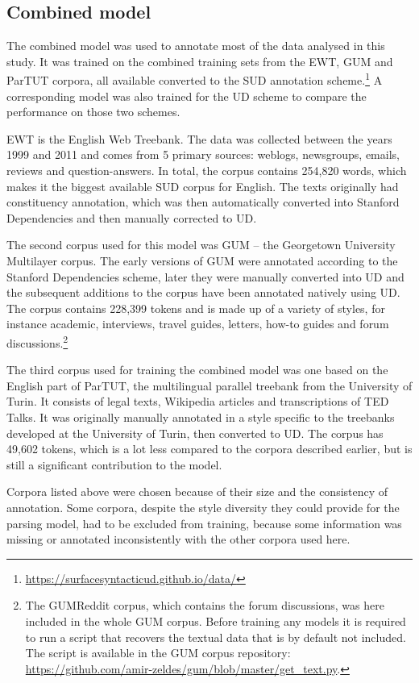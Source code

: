 \subsection{Combined model}
The combined model was used to annotate most of the data analysed in this study. It was trained on the combined training sets from the EWT, GUM and ParTUT corpora, all available converted to the SUD annotation scheme.\footnote{\url{https://surfacesyntacticud.github.io/data/}} A corresponding model was also trained for the UD scheme to compare the performance on those two schemes.

EWT is the English Web Treebank. The data was collected between the years 1999 and 2011 and comes from 5 primary sources: weblogs, newsgroups, emails, reviews and question-answers. In total, the corpus contains 254,820 words, which makes it the biggest available SUD corpus for English. The texts originally had constituency annotation, which was then automatically converted into Stanford Dependencies and then manually corrected to UD. 

The second corpus used for this model was GUM -- the Georgetown University Multilayer corpus. The early versions of GUM were annotated according to the Stanford Dependencies scheme, later they were manually converted into UD and the subsequent additions to the corpus have been annotated natively using UD. The corpus contains 228,399 tokens and is made up of a variety of styles, for instance academic, interviews, travel guides, letters, how-to guides and forum discussions.\footnote{The GUMReddit corpus, which contains the forum discussions, was here included in the whole GUM corpus. Before training any models it is required to run a script that recovers the textual data that is by default not included. The script is available in the GUM corpus repository: \url{https://github.com/amir-zeldes/gum/blob/master/get_text.py}.}

The third corpus used for training the combined model was one based on the English part of ParTUT, the multilingual parallel treebank from the University of Turin. It consists of legal texts, Wikipedia articles and transcriptions of TED Talks. It was originally manually annotated in a style specific to the treebanks developed at the University of Turin, then converted to UD. The corpus has 49,602 tokens, which is a lot less compared to the corpora described earlier, but is still a significant contribution to the model. 

Corpora listed above were chosen because of their size and the consistency of annotation. Some corpora, despite the style diversity they could provide for the parsing model, had to be excluded from training, because some information was missing or annotated inconsistently with the other corpora used here. 


